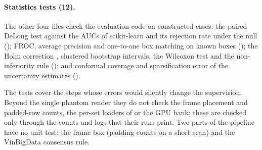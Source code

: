 \paragraph{Statistics tests (12).} The other four files check the evaluation code on constructed cases: the paired DeLong test
\citep{delong1988auc} against the AUCs of scikit-learn and its rejection rate under the null (); FROC, average precision
and one-to-one box matching on known boxes (); the Holm correction \citep{holm1979simple}, clustered bootstrap intervals,
the Wilcoxon test \citep{wilcoxon1945individual} and the non-inferiority rule (); and conformal coverage and sparsification
error of the uncertainty estimates ().

The tests cover the steps whose errors would silently change the supervision. Beyond the single phantom render they do not check the frame placement
and padded-row counts, the per-set loaders of  or the GPU bank; these are checked only through the counts and logs that their
runs print.
Two parts of the pipeline have no unit test: the frame box (padding counts on a short scan) and the VinBigData consensus rule.
